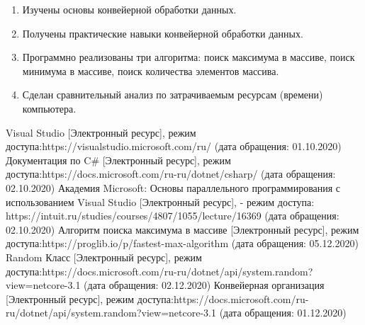 \documentclass[12pt]{report}
\begin{document}
\begin{enumerate}
\item Изучены основы конвейерной обработки данных.
\item  Получены практические навыки конвейерной обработки данных.
\item Программно реализованы три алгоритма: поиск максимума в массиве, поиск минимума в массиве, поиск количества элементов массива.
\item Сделан сравнительный анализ по затрачиваемым ресурсам (времени) компьютера.
\end{enumerate}

%
%

\begin{thebibliography}{3}
	Visual Studio [Электронный ресурс], режим доступа:https://visualstudio.microsoft.com/ru/ (дата обращения: 01.10.2020)
	Документация по C\# [Электронный ресурс], режим доступа:https://docs.microsoft.com/ru-ru/dotnet/csharp/ (дата обращения: 02.10.2020)
	Академия Microsoft: Основы параллельного программирования с использованием Visual Studio [Электронный ресурс], - режим доступа: https://intuit.ru/studies/courses/4807/1055/lecture/16369 (дата обращения: 02.10.2020)
	 Алгоритм поиска максимума в массиве [Электронный ресурс], режим доступа:https://proglib.io/p/fastest-max-algorithm (дата обращения: 05.12.2020)
	Random Класс [Электронный ресурс], режим доступа:https://docs.microsoft.com/ru-ru/dotnet/api/system.random?view=netcore-3.1 (дата обращения: 02.12.2020)
	Конвейерная организация [Электронный ресурс], режим доступа:https://docs.microsoft.com/ru-ru/dotnet/api/system.random?view=netcore-3.1 (дата обращения: 01.12.2020)
\end{thebibliography}
\end{document}
